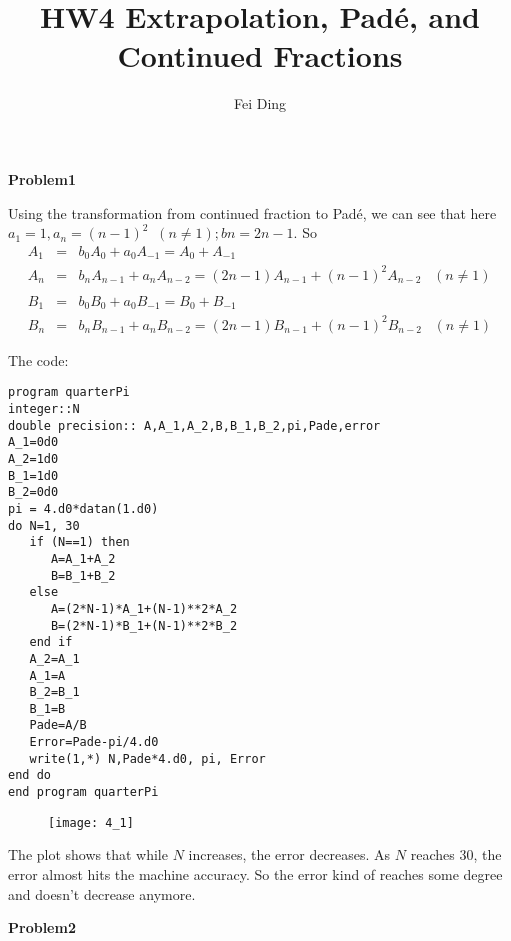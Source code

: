 \documentclass{article}
\title{HW4 Extrapolation, Pad\'{e}, and Continued Fractions}
\author{Fei Ding}
\begin{document}
\maketitle

\textbf{Problem1}

Using the transformation from continued fraction to Pad\'{e}, we can see that here $a_1=1,   a_n=(n-1)^2  \;\;(n\not=1);  bn=2n-1.$ So 
\begin{eqnarray*}
A_1&=&b_0A_0+a_0A_{-1}=A_0+A_{-1}\\
A_n&=&b_nA_{n-1}+a_nA_{n-2}=(2n-1)A_{n-1}+(n-1)^2A_{n-2}  \;\;\; (n\not=1)\\
\\
B_1&=&b_0B_0+a_0B_{-1}=B_0+B_{-1}\\
B_n&=&b_nB_{n-1}+a_nB_{n-2}=(2n-1)B_{n-1}+(n-1)^2B_{n-2}   \;\;\;(n\not=1)
\end{eqnarray*}

The code:
\begin{verbatim}
program quarterPi
integer::N
double precision:: A,A_1,A_2,B,B_1,B_2,pi,Pade,error
A_1=0d0
A_2=1d0
B_1=1d0
B_2=0d0
pi = 4.d0*datan(1.d0)
do N=1, 30
   if (N==1) then 
      A=A_1+A_2
      B=B_1+B_2
   else
      A=(2*N-1)*A_1+(N-1)**2*A_2
      B=(2*N-1)*B_1+(N-1)**2*B_2
   end if
   A_2=A_1
   A_1=A
   B_2=B_1
   B_1=B
   Pade=A/B
   Error=Pade-pi/4.d0
   write(1,*) N,Pade*4.d0, pi, Error  
end do
end program quarterPi 
\end{verbatim}

\begin{figure} [ht]
\texttt{[image: 4\_1]}
\end{figure}

The plot shows that while $N$ increases, the error decreases.   As $N$ reaches 30, the error almost hits the machine accuracy.  So the error kind of reaches some degree and doesn't decrease anymore.

\vskip 1cm




\textbf{Problem2}
\end{document}
